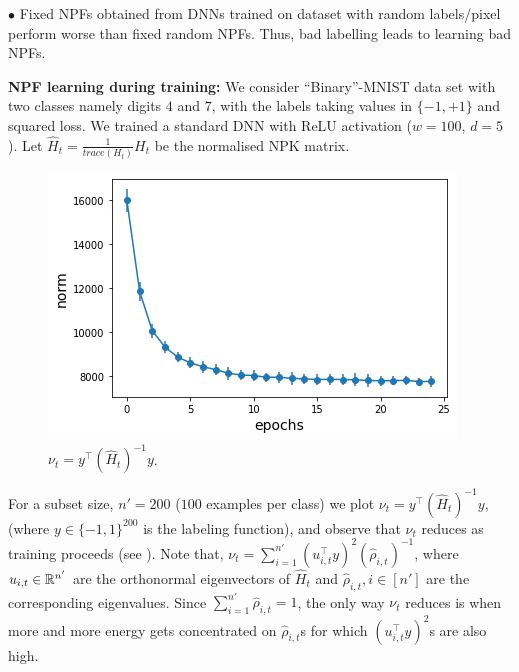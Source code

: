 $\bullet$ Fixed NPFs obtained from DNNs trained on dataset with random labels/pixel perform worse than fixed random NPFs. Thus, bad labelling leads to learning bad NPFs.

\textbf{NPF learning during training:} We consider ``Binary''-MNIST data set with two classes namely digits $4$ and $7$, with the labels taking values in $\{-1,+1\}$ and squared loss. We trained a standard DNN with ReLU activation ($w=100$, $d=5$). Let $\widehat{H}_t=\frac{1}{trace(H_t)}H_t$ be the normalised NPK matrix. 
\begin{figure}
\includegraphics[scale=0.25]{figs/path-gram.png}
\caption{\label{fig:gen}$\nu_t=y^\top (\widehat{H}_t)^{-1} y$.}
\end{figure}
For a subset size, $n'=200$ ($100$ examples per class) we plot $\nu_t=y^\top (\widehat{H}_t)^{-1} y$, (where $y\in\{-1,1\}^{200}$ is the labeling function), and observe that $\nu_t$ reduces as training proceeds (see ). Note that, $\nu_t=\sum_{i=1}^{n'}(u_{i,t}^\top y)^2 (\hat{\rho}_{i,t})^{-1}$, where $u_{i,t}\in \mathbb{R}^{n'}$ are the orthonormal eigenvectors of $\widehat{H}_t$ and $\hat{\rho}_{i,t},i\in[n']$ are the corresponding eigenvalues. Since $\sum_{i=1}^{n'}\hat{\rho}_{i,t}=1$, the only way $\nu_t$ reduces is when more and more energy gets concentrated on $\hat{\rho}_{i,t}$s for which $(u_{i,t}^\top y)^2$s are also high.\WFclear%

